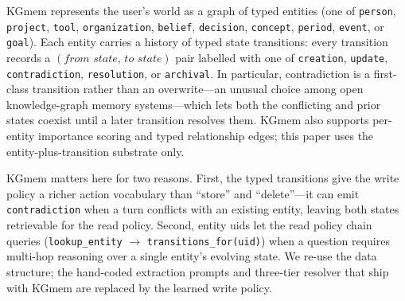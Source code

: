 \documentclass[11pt]{article}
\begin{document}
KGmem represents the user's world as a graph of typed entities (one of
\texttt{person}, \texttt{project}, \texttt{tool}, \texttt{organization},
\texttt{belief}, \texttt{decision}, \texttt{concept}, \texttt{period},
\texttt{event}, or \texttt{goal}). Each entity carries a history of
typed state transitions: every transition records a $(\textit{from
state},\,\textit{to state})$ pair labelled with one of
\texttt{creation}, \texttt{update}, \texttt{contradiction},
\texttt{resolution}, or \texttt{archival}. In particular,
contradiction is a first-class transition rather than an overwrite---an
unusual choice among open knowledge-graph memory systems---which lets
both the conflicting and prior states coexist until a later transition
resolves them. KGmem also supports per-entity importance scoring and
typed relationship edges; this paper uses the entity-plus-transition
substrate only.

KGmem matters here for two reasons. First, the typed transitions give
the write policy a richer action vocabulary than ``store'' and
``delete''---it can emit \texttt{contradiction} when a turn conflicts
with an existing entity, leaving both states retrievable for the read
policy. Second, entity uids let the read policy chain queries
(\texttt{lookup\_entity} $\to$ \texttt{transitions\_for(uid)}) when a
question requires multi-hop reasoning over a single entity's evolving
state. We re-use the data structure; the hand-coded extraction prompts
and three-tier resolver that ship with KGmem are replaced by the
learned write policy.
\end{document}
